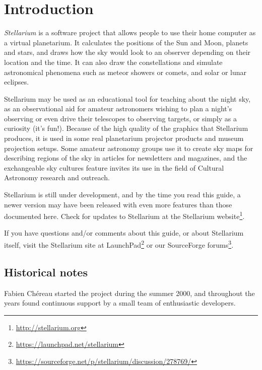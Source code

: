 

\chapter{Introduction}
\label{ch:Introduction}

\emph{Stellarium} is a software project that allows people to use their
home computer as a virtual planetarium. It calculates the positions of
the Sun and Moon, planets and stars, and draws how the sky would look to
an observer depending on their location and the time. It can also draw
the constellations and simulate astronomical phenomena such as meteor
showers or comets, and solar or lunar eclipses.

Stellarium may be used as an educational tool for teaching about the
night sky, as an observational aid for amateur astronomers wishing to
plan a night's observing or even drive their telescopes to observing
targets, or simply as a curiosity (it's fun!). Because of the high
quality of the graphics that Stellarium produces, it is used in some
real planetarium projector products and museum projection setups. Some
amateur astronomy groups use it to create sky maps for describing
regions of the sky in articles for newsletters and magazines, and the
exchangeable sky cultures feature invites its use in the field of
Cultural Astronomy research and outreach.

Stellarium is still under development, and by the time you read
this guide, a newer version may have been released with even more
features than those documented here. Check for updates to Stellarium at
the Stellarium website\footnote{\url{http://stellarium.org}}.

If you have questions and/or comments about this guide, or about
Stellarium itself, visit the Stellarium site at
LaunchPad\footnote{\url{https://launchpad.net/stellarium}} or our
SourceForge
forums\footnote{\url{https://sourceforge.net/p/stellarium/discussion/278769/}}.


\section{Historical notes}
\label{sec:Introduction:HistoricalNotes}

Fabien Ch\'ereau started the project during the summer 2000, and throughout
the years found continuous support by a small team of enthusiastic developers.

